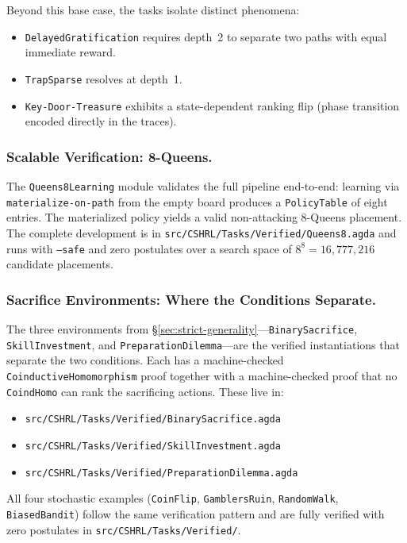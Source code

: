\documentclass[runningheads]{llncs}
\newcommand{\fpath}[1]{\nolinkurl{#1}}
\begin{document}
Beyond this base case, the tasks isolate distinct phenomena:
\begin{itemize}
\item \texttt{DelayedGratification} requires depth~2 to separate two paths with equal immediate reward.
\item \texttt{TrapSparse} resolves at depth~1.
\item \texttt{Key-Door-Treasure} exhibits a state-dependent ranking flip (phase transition encoded directly in the traces).
\end{itemize}

\subsubsection{Scalable Verification: 8-Queens.}

The \texttt{Queens8Learning} module validates the full pipeline end-to-end: learning via \texttt{materialize-on-path} from the empty board produces a \texttt{PolicyTable} of eight entries.  The materialized policy yields a valid non-attacking 8-Queens placement.  The complete development is in \fpath{src/CSHRL/Tasks/Verified/Queens8.agda} and runs with \texttt{--safe} and zero postulates over a search space of $8^8 = 16{,}777{,}216$ candidate placements.

\subsubsection{Sacrifice Environments: Where the Conditions Separate.}

The three environments from \S\ref{sec:strict-generality}---\texttt{BinarySacrifice}, \texttt{SkillInvestment}, and \texttt{PreparationDilemma}---are the verified instantiations that separate the two conditions.  Each has a machine-checked \texttt{CoinductiveHomomorphism} proof together with a machine-checked proof that no \texttt{CoindHomo} can rank the sacrificing actions.  These live in:
\begin{itemize}
\item \fpath{src/CSHRL/Tasks/Verified/BinarySacrifice.agda}
\item \fpath{src/CSHRL/Tasks/Verified/SkillInvestment.agda}
\item \fpath{src/CSHRL/Tasks/Verified/PreparationDilemma.agda}
\end{itemize}

All four stochastic examples (\texttt{CoinFlip}, \texttt{GamblersRuin}, \texttt{RandomWalk}, \texttt{BiasedBandit}) follow the same verification pattern and are fully verified with zero postulates in \fpath{src/CSHRL/Tasks/Verified/}.
\end{document}
